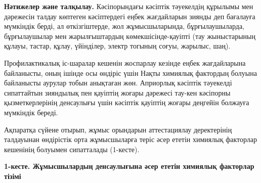 {\bfseries Нәтижелер және талқылау.} Кәсіпорындағы кәсіптік тәуекелдің
құрылымы мен дәрежесін талдау көптеген кәсіптердегі еңбек жағдайларын
зиянды деп бағалауға мүмкіндік берді, ал өткізгіштерде, жол
жұмысшыларында, бұрғылаушыларда, бұрғылаушылар мен жарылғыштардың
көмекшісінде-қауіпті (тау жыныстарының құлауы, тастар, құлау, үйінділер,
электр тогының соғуы, жарылыс, шаң).

Профилактикалық іс-шаралар кешенін жоспарлау кезінде еңбек жағдайларына
байланысты, оның ішінде осы өндіріс үшін Нақты химиялық фактордың
болуына байланысты аурулар тобын анықтаған жөн. Априорлық кәсіптік
тәуекелді сипаттайтын зияндылық пен қауіптің жоғары дәрежесі тау-кен
кәсіпорны қызметкерлерінің денсаулығы үшін кәсіптік қауіптің жоғары
деңгейін болжауға мүмкіндік береді.

Ақпаратқа сүйене отырып, жұмыс орындарын аттестациялау деректерінің
талдауынан өндірістік орта жұмысшыларға теріс әсер ететін химиялық
факторлар кешенінің болуымен сипатталады (1-кесте).

{\bfseries 1-кесте. Жұмысшылардың денсаулығына әсер ететін химиялық
факторлар тізімі}


